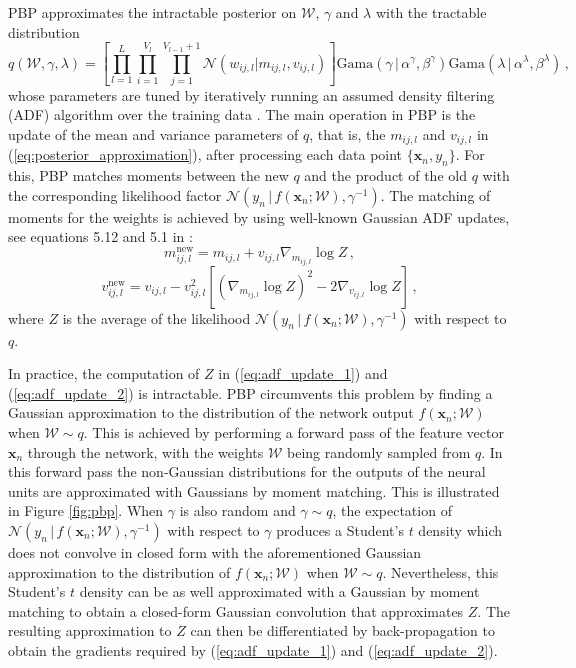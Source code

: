 PBP approximates the intractable posterior on $\mathcal{W}$, $\gamma$ and $\lambda$ with the tractable distribution
\begin{equation}
q(\mathcal{W},\gamma, \lambda) = \left[ \prod_{l=1}^L\! \prod_{i=1}^{V_l}\! 
\prod_{j=1}^{V_{l\!-\!1}\!+\!1} \mathcal{N}(w_{ij,l}| m_{ij,l},v_{ij,l})\right ]
 \text{Gama}(\gamma \,|\, \alpha^\gamma, \beta^\gamma)
\text{Gama}(\lambda \,|\, \alpha^\lambda, \beta^\lambda)\,,\label{eq:posterior_approximation}
\end{equation}
whose parameters are tuned by iteratively running an assumed density filtering (ADF) algorithm over the training data \cite{Opper1998}. The main operation in PBP is the update of the mean and variance parameters of $q$, that is, the $m_{ij,l}$ and $v_{ij,l}$ in
(\ref{eq:posterior_approximation}), after processing each data point $\{\mathbf{x}_n,y_n\}$. For this, PBP matches moments between the new $q$ and the product of the old $q$ with the corresponding likelihood factor $\mathcal{N}(y_n \,|\, f(\mathbf{x}_n;\mathcal{W}),\gamma^{-1})$. The matching of moments for the weights is achieved by using well-known Gaussian ADF updates, see equations 5.12 and 5.1 in \cite{minka2001family}:
\begin{equation}
\label{eq:adf_update_1} m_{ij,l}^\text{new} =  m_{ij,l} + v_{ij,l} \nabla_{m_{ij,l}} \log Z \,,
\end{equation}
\begin{equation}
\label{eq:adf_update_2}v_{ij,l}^\text{new} = v_{ij,l} - v_{ij,l}^2 \left[ (\nabla_{m_{ij,l}} \log Z)^2 - 2 \nabla_{v_{ij,l}} \log Z \right]\,,
\end{equation}
where $Z$ is the average of the likelihood $\mathcal{N}(y_n\,|\, f(\mathbf{x}_n;\mathcal{W}),\gamma^{-1})$ with respect to $q$. 

In practice, the computation of $Z$ in (\ref{eq:adf_update_1}) and (\ref{eq:adf_update_2}) is intractable. PBP circumvents this problem by finding a Gaussian approximation to the distribution of the network output $f(\mathbf{x}_n;\mathcal{W})$ when $\mathcal{W} \sim q$. This is achieved by performing a forward pass of the feature vector $\mathbf{x}_n$ through the network, with the weights $\mathcal{W}$ being randomly sampled from $q$. In this forward pass the non-Gaussian distributions for the outputs of the neural units are approximated with Gaussians by moment matching. This is illustrated in Figure \ref{fig:pbp}. When $\gamma$ is also random and $\gamma\sim q$, the expectation of $\mathcal{N}(y_n \,|\, f(\mathbf{x}_n;\mathcal{W}),\gamma^{-1})$ with respect to $\gamma$ produces a Student's $t$ density which does not convolve in closed form with the aforementioned Gaussian approximation to the distribution of $f(\mathbf{x}_n;\mathcal{W})$ when $\mathcal{W} \sim q$. Nevertheless, this Student's $t$ density can be as well approximated with a Gaussian by moment matching to obtain a closed-form Gaussian convolution that approximates $Z$. The resulting approximation to $Z$ can then be differentiated by back-propagation to obtain the gradients required by (\ref{eq:adf_update_1}) and (\ref{eq:adf_update_2}).


